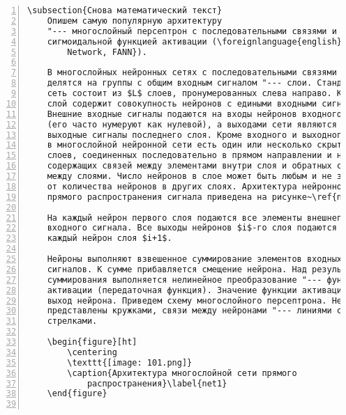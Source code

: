\documentclass[bachelor, och, pract]{SCWorks}
\begin{document}
\begin{Verbatim}[fontsize=\small, numbers=left]
	\subsection{Снова математический текст}
	Опишем самую популярную архитектуру
	"--- многослойный персептрон с последовательными связями и
	сигмоидальной функцией активации (\foreignlanguage{english}{Feedforward Artifitial Neural
		Network, FANN}).
	
	В многослойных нейронных сетях с последовательными связями нейроны
	делятся на группы с общим входным сигналом "--- слои. Стандартная
	сеть состоит из $L$ слоев, пронумерованных слева направо. Каждый
	слой содержит совокупность нейронов с едиными входными сигналами.
	Внешние входные сигналы подаются на входы нейронов входного слоя
	(его часто нумеруют как нулевой), а выходами сети являются
	выходные сигналы последнего слоя. Кроме входного и выходного слоев
	в многослойной нейронной сети есть один или несколько скрытых
	слоев, соединенных последовательно в прямом направлении и не
	содержащих связей между элементами внутри слоя и обратных связей
	между слоями. Число нейронов в слое может быть любым и не зависит
	от количества нейронов в других слоях. Архитектура нейронной сети
	прямого распространения сигнала приведена на рисунке~\ref{net1}.
	
	На каждый нейрон первого слоя подаются все элементы внешнего
	входного сигнала. Все выходы нейронов $i$-го слоя подаются на
	каждый нейрон слоя $i+1$.
	
	Нейроны выполняют взвешенное суммирование элементов входных
	сигналов. К сумме прибавляется смещение нейрона. Над результатом
	суммирования выполняется нелинейное преобразование "--- функция
	активации (передаточная функция). Значение функции активации есть
	выход нейрона. Приведем схему многослойного персептрона. Нейроны
	представлены кружками, связи между нейронами "--- линиями со
	стрелками.
	
	\begin{figure}[ht]
		\centering
		\texttt{[image: 101.png]}
		\caption{Архитектура многослойной сети прямого
			распространения}\label{net1}
	\end{figure}
	

\end{Verbatim}
\end{document}
